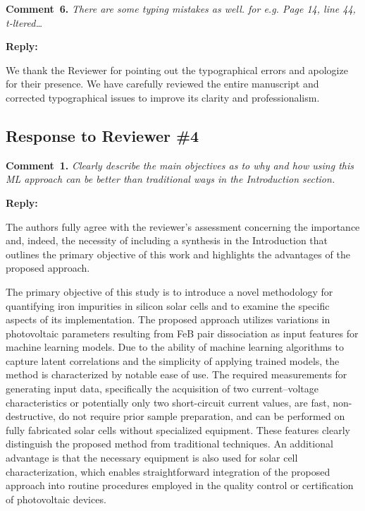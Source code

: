 \documentclass[a4paper,fleqn]{cas-sc}
\begin{document}




\vspace{1cm}
\noindent
\textcolor[rgb]{0.00,0.50,1.00}{\textbf{Comment~6.}}
\emph{There are some typing mistakes as well. for e.g. Page 14, line 44, t-ltered…}

\noindent
\textcolor[rgb]{0.51,0.00,0.00}{\textbf{Reply:}}

We thank the Reviewer for pointing out the typographical errors and apologize for their presence.
We have carefully reviewed the entire manuscript and corrected typographical issues to improve its clarity and  professionalism.


\vspace{1cm}
\subsection*{Response to Reviewer \#4 }

\noindent
\textcolor[rgb]{0.00,0.50,1.00}{\textbf{Comment~1.}}
\emph{Clearly describe the main objectives as to why and how using this ML approach can be better than traditional ways in the Introduction section.}

\noindent
\textcolor[rgb]{0.51,0.00,0.00}{\textbf{Reply:}}

The authors fully agree with the reviewer's assessment concerning the importance and,
indeed, the necessity of including a synthesis in the Introduction
that outlines the primary objective of this work and highlights the advantages of the proposed approach.


The primary objective of this study is to introduce a novel methodology for quantifying iron impurities
in silicon solar cells and to examine the specific aspects of its implementation.
The proposed approach utilizes variations in photovoltaic parameters resulting
from FeB pair dissociation as input features for machine learning models.
Due to the ability of machine learning algorithms to capture latent correlations and the simplicity of applying trained models,
the method is characterized by notable ease of use.
The required measurements for generating input data,
specifically the acquisition of two current–voltage characteristics or potentially
only two short-circuit current values, are fast, non-destructive, do not require prior sample preparation,
and can be performed on fully fabricated solar cells without specialized equipment.
These features clearly distinguish the proposed method from traditional techniques.
An additional advantage is that the necessary equipment is also used for solar cell characterization,
which enables straightforward integration of the proposed approach into routine procedures
employed in the quality control or certification of photovoltaic devices.
\end{document}
